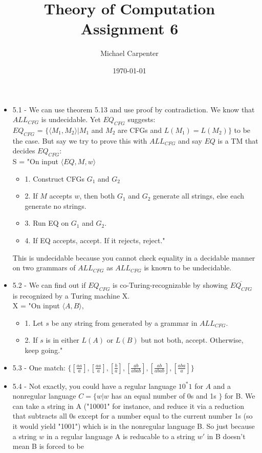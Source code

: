 \documentclass{article}
\title{Theory of Computation \\ Assignment 6}
\author{Michael Carpenter}
\date{\today}
\begin{document}
\maketitle

\begin{itemize}
  \item 5.1 - We can use theorem 5.13 and use proof by contradiction. We know that $ALL_{CFG}$ is undecidable. Yet $EQ_{CFG}$ suggests: \\
    $EQ_{CFG}$ = $\{\langle M_{1}, M_{2}\rangle | M_{1}$ and $M_{2}$ are CFGs and $L(M_{1}) = L(M_{2})\}$ to be the case. But say we try to prove this with $ALL_{CFG}$ and say $EQ$ is a TM that decides $EQ_{CFG}$:\\
    S = "On input $\langle EQ,M, w \rangle$\\
    \begin{itemize}
      \item 1. Construct CFGs $G_{1}$ and $G_{2}$
      \item 2. If $M$ accepts $w$, then both $G_{1}$ and $G_{2}$ generate all strings, else each generate no strings.
      \item 3. Run EQ on $G_{1}$ and $G_{2}$.
      \item 4. If EQ accepts, accept. If it rejects, reject."
    \end{itemize}
    This is undecidable because you cannot check equality in a decidable manner on two grammars of $ALL_{CFG}$ as $ALL_{CFG}$ is known to be undecidable.
  \item 5.2 - We can find out if $EQ_{CFG}$ is co-Turing-recognizable by showing $\overline{EQ_{CFG}}$ is recognized by a Turing machine X.\\
    X = "On input $\langle A, B\rangle$,
    \begin{itemize}
      \item 1. Let $s$ be any string from generated by a grammar in $ALL_{CFG}$.
      \item 2. If $s$ is in either $L(A)$ or $L(B)$ but not both, accept. Otherwise, keep going."
    \end{itemize}
  \item 5.3 - One match: $\{[\frac{aa}{a}],[\frac{aa}{a}],[\frac{b}{a}],[\frac{ab}{abab}],[\frac{ab}{abab}],[\frac{aba}{a}]\}$
  \item 5.4 - Not exactly, you could have a regular language $10^{*}1$ for $A$ and a nonregular language $C = \{w|w$ has an equal number of 0s and 1s $\}$ for B. We can take a string in A ("10001" for instance, and reduce it via a reduction that subtracts all 0s except for a number equal to the current number 1s (so it would yield "1001") which is in the nonregular language B. So just because a string $w$ in a regular language A is reducable to a string $w'$ in B doesn't mean B is forced to be

\end{itemize}
\end{document}
